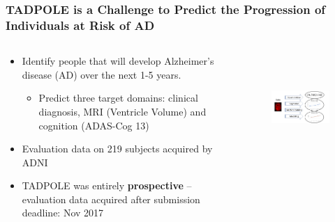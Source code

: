 \documentclass[8pt,xcolor=table,aspectratio=169]{beamer}
\begin{document}
\begin{frame}
\frametitle{TADPOLE is a Challenge to Predict the Progression of Individuals at Risk of AD}


\begin{columns}[t]
\begin{column}[t]{0.5\textwidth}

\begin{itemize}
 \item Identify people that will develop Alzheimer's disease (AD) over the next 1-5 years.

  \begin{itemize}
    \item Predict three target domains: clinical diagnosis, MRI (Ventricle Volume) and cognition (ADAS-Cog 13) 
  \end{itemize}

 \vspace{2em}

  \item Evaluation data on 219 subjects acquired by ADNI

 \vspace{2em}

 \item TADPOLE was entirely \textbf{prospective} -- evaluation data acquired after submission deadline: Nov 2017
 
 \vspace{2em}
 
 
 

\end{itemize}


\end{column}
\begin{column}[t]{0.5\textwidth}
 \begin{figure}
\centering
\includegraphics[height=4cm]{tadpole_diagram} 
\end{figure}
\vspace{-1em}


\end{column}
\end{columns}
\end{frame}
\end{document}
